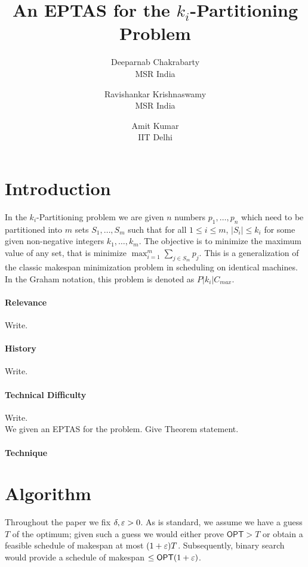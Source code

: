 \documentclass{article}[11pt]
\def\opt{\mathsf{OPT}}
\begin{document}
\title{An EPTAS for the $k_i$-Partitioning Problem}
\author{Deeparnab Chakrabarty \\ MSR India \and Ravishankar Krishnaswamy \\ MSR India \and Amit Kumar \\ IIT Delhi}
\date{}
\maketitle
\section{Introduction}
In the $k_i$-Partitioning problem we are given $n$ numbers $p_1,\ldots,p_n$ which need to be partitioned into $m$ sets $S_1,\ldots,S_m$ such that for all $1\le i\le m$, $|S_i| \leq k_i$ for some given non-negative integers $k_1,\ldots,k_m$.
The objective is to minimize the maximum value of any set, that is minimize $\max_{i=1}^m \sum_{j\in S_m} p_j$. This is a generalization of the classic makespan minimization problem in scheduling on identical machines.
In the Graham notation, this problem is denoted as $P|k_i|C_{max}$. 

\paragraph{Relevance} Write.

\paragraph{History} Write.

\paragraph{Technical Difficulty} Write.  \\

\noindent
We given an EPTAS for the problem. Give Theorem statement. 

\paragraph{Technique}

	
\section{Algorithm}

Throughout the paper we fix $\delta,\varepsilon > 0$. As is standard, we assume we have a guess $T$ of the optimum; given such a guess we would either prove $\opt > T$ or obtain a feasible schedule of makespan at most $(1+\varepsilon)T$.
Subsequently, binary search would provide a schedule of makespan $\leq \opt(1+\eps)$. \smallskip
\end{document}

